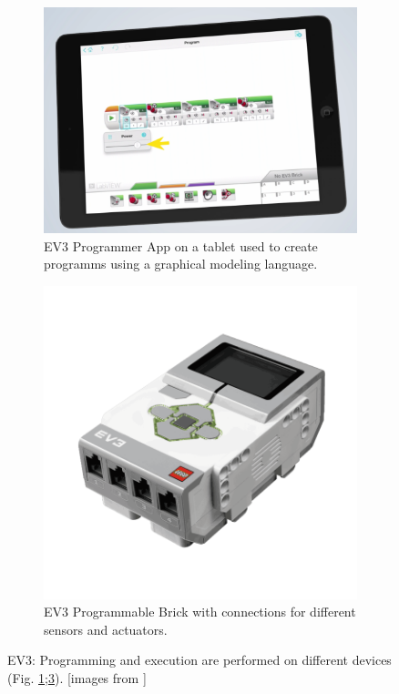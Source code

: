\documentclass[runningheads,a4paper]{llncs}
\begin{document}
\begin{figure}[H]
	  \centering
	  \begin{subfigure}[t]{0.45\textwidth}\centering\includegraphics[width=.9\columnwidth]{images/mindstorms0.PNG}
	  \caption{EV3 Programmer App on a tablet used to create programms using a graphical modeling language. }\label{fig:ev3app}\end{subfigure}\hspace*{\fill}
	  \begin{subfigure}[t]{0.45\textwidth}\centering\includegraphics[width=.9\columnwidth]{images/ev3brick.png}
	  \caption{EV3 Programmable Brick with connections for different sensors and actuators. }  \label{fig:ev3pbrick}\end{subfigure}
	  \caption{EV3: Programming and execution are performed on different devices (Fig. \ref{fig:ev3app};\ref{fig:ev3pbrick}). [images from \cite{legoev3}]}
\end{figure}
\end{document}
